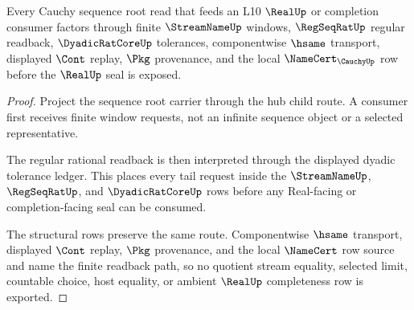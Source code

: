 \begin{theorem}
\label{thm:cauchy-sequence-regseqrat-stream-anchor}
Every Cauchy sequence root read that feeds an L10 $\RealUp$ or completion consumer factors through finite $\StreamNameUp$ windows, $\RegSeqRatUp$ regular readback, $\DyadicRatCoreUp$ tolerances, componentwise $\hsame$ transport, displayed $\Cont$ replay, $\Pkg$ provenance, and the local $\NameCert_{\CauchyUp}$ row before the $\RealUp$ seal is exposed.
\end{theorem}
\begin{proof}
Project the sequence root carrier through the hub child route. A consumer first receives finite window requests, not an infinite sequence object or a selected representative.

The regular rational readback is then interpreted through the displayed dyadic tolerance ledger. This places every tail request inside the $\StreamNameUp$, $\RegSeqRatUp$, and $\DyadicRatCoreUp$ rows before any Real-facing or completion-facing seal can be consumed.

The structural rows preserve the same route. Componentwise $\hsame$ transport, displayed $\Cont$ replay, $\Pkg$ provenance, and the local $\NameCert$ row source and name the finite readback path, so no quotient stream equality, selected limit, countable choice, host equality, or ambient $\RealUp$ completeness row is exported.
\end{proof}

